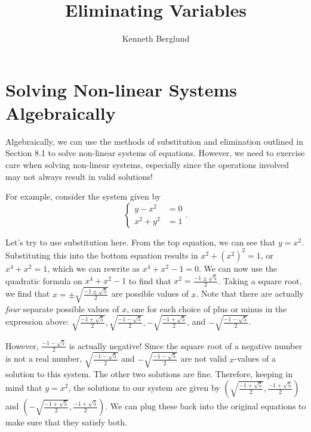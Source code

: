\documentclass[nooutcomes]{ximera}
\author{Kenneth Berglund}
\title{Eliminating Variables}
\begin{document}
\licenseSZ
\begin{abstract}
  
\end{abstract}
\maketitle


\section{Solving Non-linear Systems Algebraically}
Algebraically, we can use the methods of substitution and elimination outlined in Section 8.1 to solve non-linear systems of equations. However, we need to exercise care when solving non-linear systems, especially since the operations involved may not always result in valid solutions! 

For example, consider the system given by 
$$
\begin{cases}
y - x^2 & = 0\\
x^2 + y^2 &= 1
\end{cases}.
$$

Let's try to use substitution here. From the top equation, we can see that $y = x^2$. Substituting this into the bottom equation results in $x^2 + (x^2)^2 = 1$, or $x^4 + x^2 = 1$, which we can rewrite as $x^4 + x^2 - 1 = 0$. We can now use the quadratic formula on $x^4 + x^2 - 1$ to find that $x^2 = \frac{-1 \pm \sqrt{5}}{2}$. Taking a square root, we find that $x = \pm \sqrt{\frac{-1 \pm \sqrt{5}}{2}}$ are possible values of $x$. Note that there are actually \emph{four} separate possible values of $x$, one for each choice of plus or minus in the expression above: $\sqrt{\frac{-1 + \sqrt{5}}{2}}, \sqrt{\frac{-1 - \sqrt{5}}{2}}, -\sqrt{\frac{-1 + \sqrt{5}}{2}}$, and $-\sqrt{\frac{-1 - \sqrt{5}}{2}}$. 

However, $\frac{-1 - \sqrt{5}}{2}$ is actually negative! Since the square root of a negative number is not a real number, $\sqrt{\frac{-1 - \sqrt{5}}{2}}$ and $-\sqrt{\frac{-1 - \sqrt{5}}{2}}$ are not valid $x$-values of a solution to this system. The other two solutions are fine. Therefore, keeping in mind that $y = x^2$, the solutions to our system are given by $\left(\sqrt{\frac{-1 + \sqrt{5}}{2}}, \frac{-1 + \sqrt{5}}{2}\right)$ and $\left(-\sqrt{\frac{-1 + \sqrt{5}}{2}}, \frac{-1 + \sqrt{5}}{2}\right)$. We can plug these back into the original equations to make sure that they satisfy both. 
\end{document}
